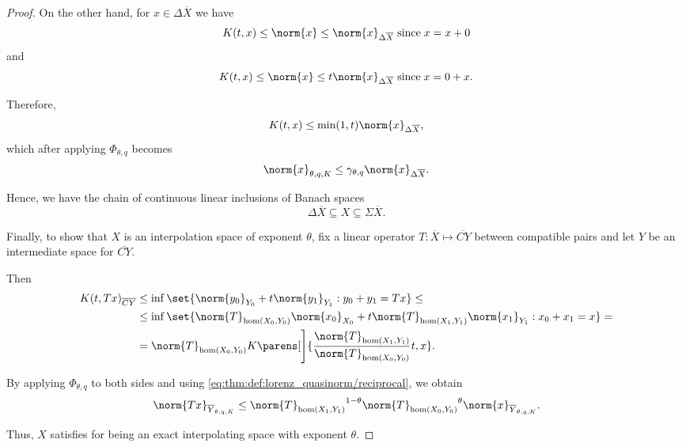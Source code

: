 \begin{proof}
  On the other hand, for \( x \in \Delta \overline{X} \) we have
  \begin{equation*}
    K(t, x) \leq \norm{x} \leq \norm{x}_{\Delta \overline{X}} \T{since} x = x + 0
  \end{equation*}
  and
  \begin{equation*}
    K(t, x) \leq \norm{x} \leq t \norm{x}_{\Delta \overline{X}} \T{since} x = 0 + x.
  \end{equation*}

  Therefore,
  \begin{equation*}
    K(t, x) \leq \min(1, t) \norm{x}_{\Delta \overline{X}},
  \end{equation*}
  which after applying \( \Phi_{\theta,q} \) becomes
  \begin{equation*}
    \norm{x}_{\theta,q,K} \leq \gamma_{\theta,q} \norm{x}_{\Delta \overline{X}}.
  \end{equation*}

  Hence, we have the chain of continuous linear inclusions of Banach spaces
  \begin{equation*}
    \Delta \overline{X} \subseteq X \subseteq \Sigma \overline{X}.
  \end{equation*}

  Finally, to show that \( X \) is an interpolation space of exponent \( \theta \), fix a linear operator \( T: \overline{X} \mapsto \overline{CY} \) between compatible pairs and let \( Y \) be an intermediate space for \( \overline{CY} \).

  Then
  \begin{align*}
    K(t, Tx)_{\overline{CY}}
    &\leq
    \inf \set{ \norm{y_0}_{Y_0} + t \norm{y_1}_{Y_1} : y_0 + y_1 = Tx }
    \leq \\ &\leq
    \inf \set{ \norm{T}_{\hom(X_0, Y_0)} \norm{x_0}_{X_0} + t \norm{T}_{\hom(X_1, Y_1)} \norm{x_1}_{Y_1} : x_0 + x_1 = x }
    = \\ &=
    \norm{T}_{\hom(X_0, Y_0)} K\parens[\Bigg]{\frac {\norm{T}_{\hom(X_1, Y_1)}} {\norm{T}_{\hom(X_0, Y_0)}} t, x}.
  \end{align*}

  By applying \( \Phi_{\theta,q} \) to both sides and using \eqref{eq:thm:def:lorenz_quasinorm/reciprocal}, we obtain
  \begin{equation*}
    \norm{Tx}_{\overline{Y}_{\theta,q,K}}
    \leq
    {\norm{T}_{\hom(X_1, Y_1)}}^{1 - \theta} {\norm{T}_{\hom(X_0, Y_0)}}^{\theta} \norm{x}_{\overline{Y}_{\theta,q,K}}.
  \end{equation*}

  Thus, \( X \) satisfies  for being an exact interpolating space with exponent \( \theta \).
\end{proof}

